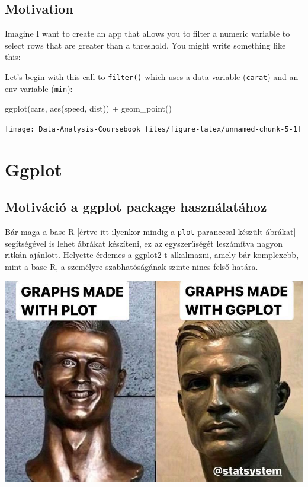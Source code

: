 \documentclass[
]{article}
\newenvironment{Shaded}{\begin{snugshade}}{\end{snugshade}}
\newcommand{\FunctionTok}[1]{\textcolor[rgb]{0.00,0.00,0.00}{#1}}
\newcommand{\NormalTok}[1]{#1}
\newcommand{\SpecialCharTok}[1]{\textcolor[rgb]{0.00,0.00,0.00}{#1}}
\begin{document}
\hypertarget{tidy-motivation}{%
\subsection{Motivation}\label{tidy-motivation}}

Imagine I want to create an app that allows you to filter a numeric variable to select rows that are greater than a threshold.
You might write something like this:

Let's begin with this call to \texttt{filter()} which uses a data-variable (\texttt{carat}) and an env-variable (\texttt{min}):

\begin{Shaded}
\begin{Highlighting}[]
\FunctionTok{ggplot}\NormalTok{(cars, }\FunctionTok{aes}\NormalTok{(speed, dist)) }\SpecialCharTok{+} 
  \FunctionTok{geom\_point}\NormalTok{()}
\end{Highlighting}
\end{Shaded}

\begin{center}\texttt{[image: Data-Analysis-Coursebook\_files/figure-latex/unnamed-chunk-5-1]} \end{center}

\hypertarget{seminar4}{%
\section{Ggplot}\label{seminar4}}

\hypertarget{motivuxe1ciuxf3-a-ggplot-package-hasznuxe1latuxe1hoz}{%
\subsection{Motiváció a ggplot package használatához}\label{motivuxe1ciuxf3-a-ggplot-package-hasznuxe1latuxe1hoz}}

Bár maga a base R {[}értve itt ilyenkor mindig a \texttt{plot} paranccsal készült ábrákat{]} segítségével is lehet ábrákat készíteni, ez az egyszerűségét leszámítva nagyon ritkán ajánlott. Helyette érdemes a ggplot2-t alkalmazni, amely bár komplexebb, mint a base R, a személyre szabhatóságának szinte nincs felső határa.

\includegraphics{images/plot_ggplot.jpg}
\end{document}
